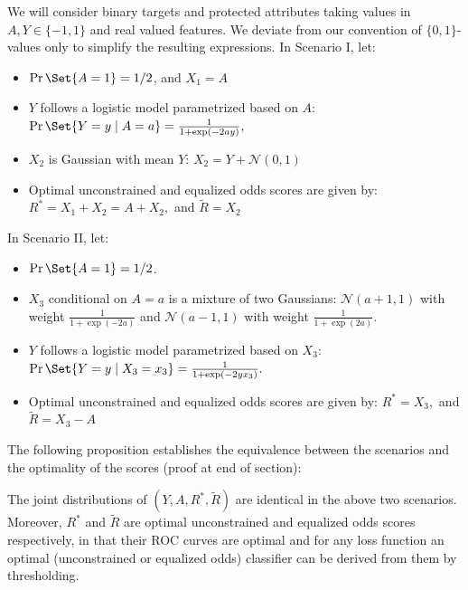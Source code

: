 We will consider binary targets and protected attributes taking values
in $A,Y\in\{-1,1\}$ and real valued features. We deviate from our convention of
$\{0,1\}$-values only to simplify the resulting expressions.
In Scenario I, let:
\begin{itemize}
\item $\Pr\Set{A=1}=1/2$, and $X_1=A$
\item $Y$ follows a logistic model parametrized based on $A$:
  $\Pr\Set{Y=y\mid A=a} = \frac1{1+\exp(-2ay)},$
\item $X_2$ is Gaussian with mean $Y$: $X_2=Y+{\mathcal N}(0,1)$
\item Optimal unconstrained and equalized odds scores are given by: $R^*=X_1 + X_2=A + X_2,$ and $\tilde{R}=X_2$
\end{itemize}
In Scenario II, let:
\begin{itemize}
\item $\Pr\Set{A=1}=1/2$.
\item $X_3$ conditional on $A=a$ is a mixture of two Gaussians:
  ${\mathcal N}(a+1, 1)$ with weight $\frac1{1+\exp(-2a)}$ and
  ${\mathcal N}(a-1, 1)$ with weight $\frac1{1+\exp(2a)}.$
\item $Y$ follows a logistic model parametrized based on $X_3$: $\Pr\Set{Y=y\mid X_3=x_3}= \frac1{1+\exp(-2yx_3)}.$
\item Optimal unconstrained and equalized odds scores are given by: $R^* = X_3,$  and $\tilde{R}= X_3-A$
\end{itemize}
%
The following proposition establishes the equivalence
between the scenarios and the optimality of the scores (proof at end of section):
\begin{proposition}\label{prop:unident}
  The joint distributions of $(Y,A,R^*,\tilde{R})$ are identical in
  the above two scenarios.  Moreover, $R^*$ and $\tilde{R}$ are
  optimal unconstrained and equalized odds scores respectively, in
  that their ROC curves are optimal and for any loss function an
  optimal (unconstrained or equalized odds) classifier can be derived
  from them by thresholding.
\end{proposition}
